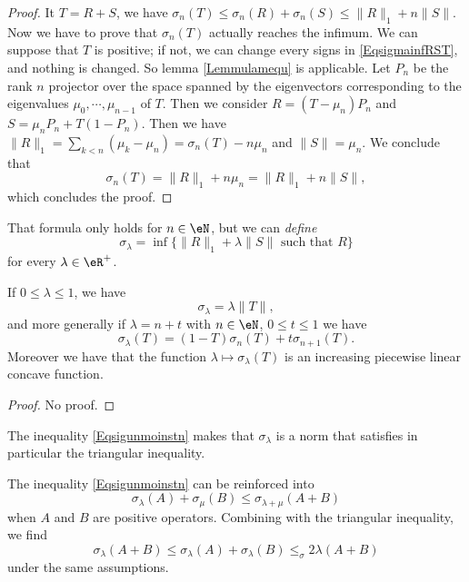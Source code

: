 \begin{proof}
It $T=R+S$, we have $\sigma_n(T)\leq\sigma_n(R)+\sigma_n(S)\leq \| R \|_1+n\| S \|$. Now we have to prove that $\sigma_n(T)$ actually reaches the infimum.  We can suppose that $T$ is positive; if not, we can change every signs in \eqref{EqsigmainfRST}, and nothing is changed. So lemma \ref{Lemmulamequ} is applicable. Let $P_n$ be the rank $n$ projector over the space spanned by the eigenvectors corresponding to the eigenvalues $\mu_0,\cdots,\mu_{n-1}$ of $T$. Then we consider $R=(T-\mu_n)P_n$ and $S=\mu_nP_n+T(1-P_n)$. Then we have $\| R \|_1=\sum_{k<n}(\mu_k-\mu_n)=\sigma_n(T)-n\mu_n$ and $\| S \|=\mu_n$. We conclude that
\[ 
  \sigma_n(T)=\| R \|_1+n\mu_n=\| R \|_1+n\| S \|,
\]
which concludes the proof.
\end{proof}
That formula only holds for $n\in\eN$, but we can \emph{define}
\begin{equation}
\sigma_{\lambda}=\inf\{ \| R \|_1+\lambda\| S \|\text{ such that }R \}
\end{equation}
for every $\lambda\in\eR^{+}$.

\begin{proposition}
If $0\leq\lambda\leq 1$, we have
\[ 
  \sigma_{\lambda}=\lambda\| T \|,
\]
and more generally if $\lambda=n+t$ with $n\in\eN$, $0\leq t\leq 1$ we have
\begin{equation}	\label{Eqsigunmoinstn}
\sigma_{\lambda}(T)=(1-T)\sigma_n(T)+t\sigma_{n+1}(T).
\end{equation}
Moreover we have that the function $\lambda\mapsto\sigma_{\lambda}(T)$ is an increasing piecewise linear concave function.
\end{proposition}
\begin{proof}
No proof.
\end{proof}
The inequality \eqref{Eqsigunmoinstn} makes that $\sigma_{\lambda}$ is a norm that satisfies in particular the triangular inequality.

\begin{proposition}
The inequality \eqref{Eqsigunmoinstn} can be reinforced into
\begin{equation}
\sigma_{\lambda}(A)+\sigma_{\mu}(B)\leq \sigma_{\lambda+\mu}(A+B)
\end{equation}
when $A$ and $B$ are positive operators. Combining with the triangular inequality, we find
\begin{equation}
\sigma_{\lambda}(A+B)\leq\sigma_{\lambda}(A)+\sigma_{\lambda}(B)\leq_\sigma{2\lambda}(A+B)
\end{equation}
under the same assumptions.
\end{proposition}

